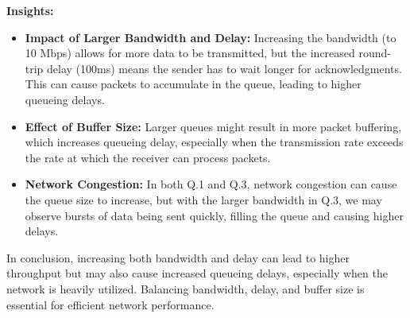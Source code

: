 \documentclass{article}
\begin{document}
\textbf{Insights:}

\begin{itemize}
    \item \textbf{Impact of Larger Bandwidth and Delay:} Increasing the bandwidth (to 10 Mbps) allows for more data to be transmitted, but the increased round-trip delay (100ms) means the sender has to wait longer for acknowledgments. This can cause packets to accumulate in the queue, leading to higher queueing delays.
    \item \textbf{Effect of Buffer Size:} Larger queues might result in more packet buffering, which increases queueing delay, especially when the transmission rate exceeds the rate at which the receiver can process packets.
    \item \textbf{Network Congestion:} In both Q.1 and Q.3, network congestion can cause the queue size to increase, but with the larger bandwidth in Q.3, we may observe bursts of data being sent quickly, filling the queue and causing higher delays.
\end{itemize}

In conclusion, increasing both bandwidth and delay can lead to higher throughput but may also cause increased queueing delays, especially when the network is heavily utilized. Balancing bandwidth, delay, and buffer size is essential for efficient network performance.
\end{document}
